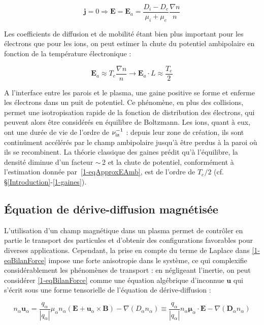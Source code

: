 \begin{refsection}
\begin{equation}
\label{1-eqEAmb}
\mathbf j=0 \Rightarrow \mathbf E=\mathbf
E_a=\frac{D_i-D_e}{\mu_i+\mu_e}\frac{\nabla
n}{n}
\end{equation}

Les coefficients de diffusion et de mobilité étant bien plus important pour les
électrons que pour les ions, on peut estimer la chute du potentiel ambipolaire
en fonction de la température électronique :

\begin{equation}
\label{1-eqApproxEAmb}
\mathbf E_a\approx T_e\frac{\nabla
n}{n}\rightarrow\mathbf E_a\cdot L\approx\frac{T_e}{2}
\end{equation}

A l'interface entre les parois et le plasma, une gaine positive se
forme et enferme les électrons dans un puit de potentiel. Ce phénomène, en plus
des collisions, permet une isotropisation rapide de la fonction de distribution
des électrons, qui peuvent alors être considérés en équilibre de Boltzmann.
Les ions, quant à eux, ont une durée de vie de l'ordre de
$\nu_\text{iz}^{{-1}}$ : depuis leur zone de création, ils sont
continûment accélérés par le champ ambipolaire jusqu'à être perdus à la paroi
où ils se recombinent. La théorie classique des gaines prédit qu'à l'équilibre,
la densité diminue d'un facteur $\sim\,$2 et la chute de potentiel, conformément
à l'estimation donnée par~\eqref{1-eqApproxEAmb}, est de l'ordre de
$T_e/2$ (cf.
\S\ref{Introduction}-\ref{1-gaines}).

\subsection{Équation de dérive-diffusion magnétisée}
\label{1-deriveDiffMag}
L'utilisation d'un champ magnétique dans un plasma permet de contrôler en partie
le transport des particules et d'obtenir des configurations favorables pour
diverses applications. Cependant, la prise en compte du terme de Laplace dans
\eqref{1-eqBilanForce} impose une forte anisotropie dans le système, ce qui
complexifie considérablement les phénomènes de transport : en
négligeant l'inertie, on peut considérer \eqref{1-eqBilanForce} comme une
équation algébrique d'inconnue $\mathbf u$ qui s'écrit sous une forme
tensorielle de l'équation de dérive-diffusion :

\begin{equation}
\label{1-eqDriftDif}
n_\alpha\mathbf u_\alpha=\frac{q_\alpha}{|q_\alpha|}\mu_\alpha
n_\alpha\left(\mathbf E+\mathbf u_\alpha\times\mathbf
B\right)-\nabla\left(D_\alpha n_\alpha\right)\equiv
\frac{q_\alpha}{|q_\alpha|} n_\alpha\boldsymbol{\mu}_\alpha\cdot \mathbf
E-{\nabla\left(\mathbf{D}_\alpha n_\alpha\right)}
\end{equation}


\end{refsection}
